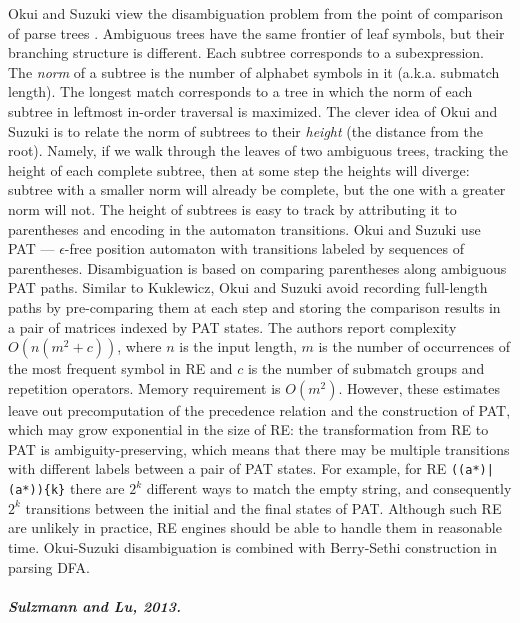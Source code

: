 \documentclass[AMA,STIX1COL]{WileyNJD-v2}
\begin{document}
Okui and Suzuki view the disambiguation problem from the point of comparison of parse trees \cite{OS13}.
Ambiguous trees have the same frontier of leaf symbols, but their branching structure is different.
Each subtree corresponds to a subexpression.
The \emph{norm} of a subtree is the number of alphabet symbols in it (a.k.a. submatch length).
The longest match corresponds to a tree in which the norm of each subtree in leftmost in-order traversal is maximized.
The clever idea of Okui and Suzuki is to relate the norm of subtrees to their \emph{height} (the distance from the root).
Namely, if we walk through the leaves of two ambiguous trees, tracking the height of each complete subtree,
then at some step the heights will diverge:
subtree with a smaller norm will already be complete, but the one with a greater norm will not.
The height of subtrees is easy to track by attributing it to parentheses and encoding in the automaton transitions.
Okui and Suzuki use PAT --- $\epsilon$-free position automaton with transitions labeled by sequences of parentheses.
Disambiguation is based on comparing parentheses along ambiguous PAT paths.
Similar to Kuklewicz, Okui and Suzuki avoid recording full-length paths
by pre-comparing them at each step and storing the comparison results in a pair of matrices indexed by PAT states.
The authors report complexity $O(n(m^2 + c))$, where
$n$ is the input length,
$m$ is the number of occurrences of the most frequent symbol in RE
and $c$ is the number of submatch groups and repetition operators.
Memory requirement is $O(m^2)$.
However, these estimates leave out precomputation of the precedence relation and the construction of PAT,
which may grow exponential in the size of RE:
the transformation from RE to PAT is ambiguity-preserving,
which means that there may be multiple transitions with different labels between a pair of PAT states.
For example, for RE \texttt{((a*)|(a*))\{k\}} there are $2^k$ different ways to match the empty string,
and consequently $2^k$ transitions between the initial and the final states of PAT.
Although such RE are unlikely in practice, RE engines should be able to handle them in reasonable time.
Okui-Suzuki disambiguation is combined with Berry-Sethi construction in parsing DFA\cite{Bor15}.

\subparagraph{Sulzmann and Lu, 2013.}
\end{document}
